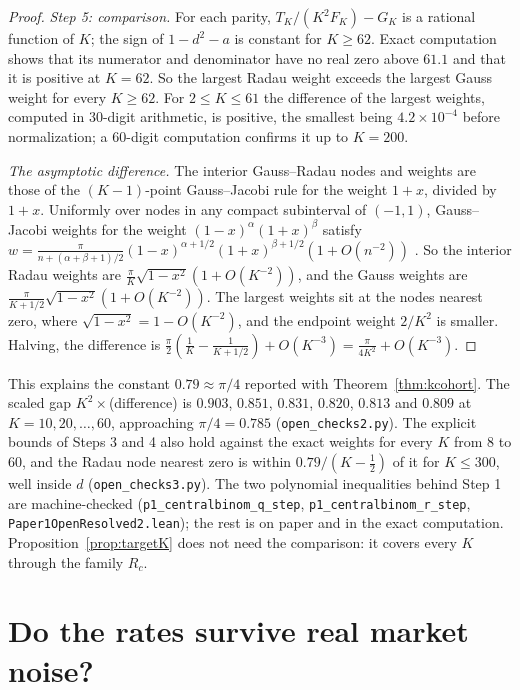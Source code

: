 \documentclass[12pt]{article}
\theoremstyle{definition}
\theoremstyle{remark}
\begin{document}
\begin{proof}
\emph{Step 5: comparison.} For each parity, $T_K/(K^2F_K)-G_K$ is a rational function of $K$; the sign of $1-d^2-a$ is constant for $K\ge62$. Exact computation shows that its numerator and denominator have no real zero above $61.1$ and that it is positive at $K=62$. So the largest Radau weight exceeds the largest Gauss weight for every $K\ge62$. For $2\le K\le61$ the difference of the largest weights, computed in 30-digit arithmetic, is positive, the smallest being $4.2\times10^{-4}$ before normalization; a 60-digit computation confirms it up to $K=200$.

\emph{The asymptotic difference.} The interior Gauss--Radau nodes and weights are those of the $(K-1)$-point Gauss--Jacobi rule for the weight $1+x$, divided by $1+x$. Uniformly over nodes in any compact subinterval of $(-1,1)$, Gauss--Jacobi weights for the weight $(1-x)^\alpha(1+x)^\beta$ satisfy $w=\frac{\pi}{n+(\alpha+\beta+1)/2}(1-x)^{\alpha+1/2}(1+x)^{\beta+1/2}(1+O(n^{-2}))$ \citep{hale2013}. So the interior Radau weights are $\frac\pi K\sqrt{1-x^2}(1+O(K^{-2}))$, and the Gauss weights are $\frac\pi{K+1/2}\sqrt{1-x^2}(1+O(K^{-2}))$. The largest weights sit at the nodes nearest zero, where $\sqrt{1-x^2}=1-O(K^{-2})$, and the endpoint weight $2/K^2$ is smaller. Halving, the difference is $\frac\pi2(\frac1K-\frac1{K+1/2})+O(K^{-3})=\frac\pi{4K^2}+O(K^{-3})$.
\end{proof}

This explains the constant $0.79\approx\pi/4$ reported with Theorem~\ref{thm:kcohort}. The scaled gap $K^2\times$(difference) is $0.903$, $0.851$, $0.831$, $0.820$, $0.813$ and $0.809$ at $K=10,20,\ldots,60$, approaching $\pi/4=0.785$ (\nolinkurl{open_checks2.py}). The explicit bounds of Steps 3 and 4 also hold against the exact weights for every $K$ from 8 to 60, and the Radau node nearest zero is within $0.79/(K-\frac12)$ of it for $K\le300$, well inside $d$ (\nolinkurl{open_checks3.py}). The two polynomial inequalities behind Step 1 are machine-checked (\texttt{p1\_centralbinom\_q\_step}, \texttt{p1\_centralbinom\_r\_step}, \nolinkurl{Paper1OpenResolved2.lean}); the rest is on paper and in the exact computation. Proposition~\ref{prop:targetK} does not need the comparison: it covers every $K$ through the family $R_c$.

\section{Do the rates survive real market noise?}\label{sec:injection}
\end{document}
